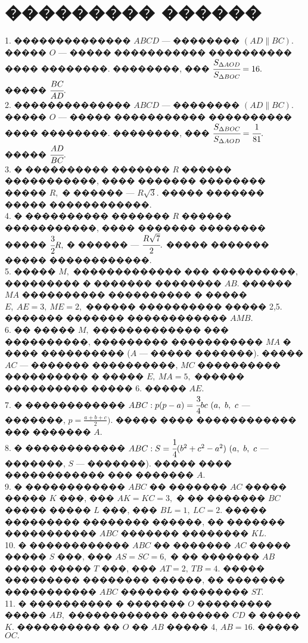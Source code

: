 \documentclass[12pt]{article}
\begin{document}
\section{��������� ������}
1. �������������� $ABCD$ --- �������� $(AD\parallel BC).$ ����� $O$ --- ����� ����������� ���������� ���� ��������. ��������, ��� $\cfrac{S_{\Delta AOD}}{S_{\Delta BOC}}=16.$ ����� $\cfrac{BC}{AD}.$\\
2. �������������� $ABCD$ --- �������� $(AD\parallel BC).$ ����� $O$ --- ����� ����������� ���������� ���� ��������. ��������, ��� $\cfrac{S_{\Delta BOC}}{S_{\Delta AOD}}=\cfrac{1}{81}.$ ����� $\cfrac{AD}{BC}.$\\
3. � ���������� ������� $R$ ������ �����������, ���� ������� �������� ����� $R,$ � ������ --- $R\sqrt{3}.$ ����� ������� ����� ������������.\\
4. � ���������� ������� $R$ ������ �����������, ���� ������� �������� ����� $\cfrac{3}{2}R,$ � ������ --- $\cfrac{R\sqrt{7}}{2}.$ ����� ������� ����� ������������.\\
5. ����� $M,$ ������������� ��� ����������, ��������� � ������� �������� $AB.$ ������ $MA$ ���������� ���������� � ����� $E,\ AE=3,\ ME=2,$ ������ ���������� ����� 2,5. ������� ������� ������������ $AMB.$\\
6. �� ����� $M,$ ������������� ��� ����������, ��������� ����������� $MA$ � ���� ���������� ($A$ --- ����� �������). ����� $AC$ --- ������� ����������, $MC$ ���������� ���������� � ����� $E,\ MA=5,$ ������ ���������� ����� 6. ����� $AE.$\\
7. � ������������ $ABC: p(p-a)=\cfrac{3}{4}bc\ (a,\ b,\ c$ --- �������, $p=\frac{a+b+c}{2}).$ ����� ���� ������������ ��� ������� $A.$\\
8. � ������������ $ABC: S=\cfrac{1}{4}(b^2+c^2-a^2)\ (a,\ b,\ c$ --- �������, $S$ --- �������). ����� ���� ������������ ��� ������� $A.$\\
9. � ������������ $ABC$ �� ������� $AC$ ����� ����� $K$ ���, ��� $AK=KC=3,$ � �� ������� $BC$ ����� ����� $L$ ���, ��� $BL=1,\ LC=2.$ ����� ��������� �������� ������, �� ������� ����������� $ABC$ ������� �������� $KL.$\\
10. � ������������ $ABC$ �� ������� $AC$ ����� ����� $S$ ���, ��� $AS=SC=6,$ � �� ������� $AB$ ����� ����� $T$ ���, ��� $AT=2,\ TB=4.$ ����� ��������� �������� ������, �� ������� ����������� $ABC$ ������� �������� $ST.$\\
11. � ���������� � ������� $O$ ��������� ����� $AB,$ ������������ ������� $CD$ � ����� $K.$ ���������� ��  $O$ �� $AB$ ����� 4, $AB=16.$ ����� $OC.$\\
\end{document}
